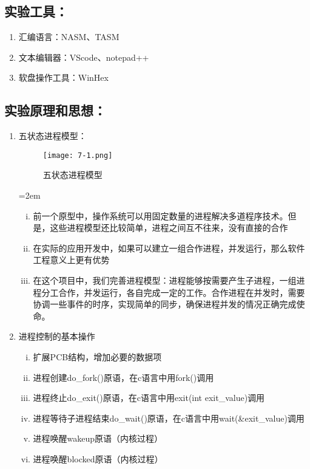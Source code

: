 \documentclass[UTF8]{article}
\begin{document}
\subsection{实验工具：}
\begin{enumerate}[1)]%
\heiti\setlength{\itemsep}{0em}
	\item 汇编语言：NASM、TASM
	\item 文本编辑器：VScode、notepad++
	\item 软盘操作工具：WinHex
\end{enumerate}

\subsection{实验原理和思想：}
{
\begin{enumerate}[1)]
\heiti
	\item 五状态进程模型：
	\begin{figure}[htbp]
			\centering
			\texttt{[image: 7-1.png]}
			\caption{五状态进程模型}
		\end{figure}
	\parindent=2em
		\begin{enumerate}[i)]
		\heiti \setlength{\itemsep}{0.2ex}
			\item 前一个原型中，操作系统可以用固定数量的进程解决多道程序技术。但是，这些进程模型还比较简单，进程之间互不往来，没有直接的合作
			\item 在实际的应用开发中，如果可以建立一组合作进程，并发运行，那么软件工程意义上更有优势
			\item 在这个项目中，我们完善进程模型：进程能够按需要产生子进程，一组进程分工合作，并发运行，各自完成一定的工作。合作进程在并发时，需要协调一些事件的时序，实现简单的同步，确保进程并发的情况正确完成使命。
		\end{enumerate}
		
	\item 进程控制的基本操作
		\begin{enumerate}[i)]
		\heiti \setlength{\itemsep}{0.2ex}
			\item 扩展PCB结构，增加必要的数据项
			\item 进程创建do\_fork()原语，在c语言中用fork()调用 
			\item 进程终止do\_exit()原语，在c语言中用exit(int exit\_value)调用
			\item 进程等待子进程结束do\_wait()原语，在c语言中用wait(\&exit\_value)调用
			\item 进程唤醒wakeup原语（内核过程）
			\item 进程唤醒blocked原语（内核过程）
		\end{enumerate}
		

\end{enumerate}}
\end{document}
